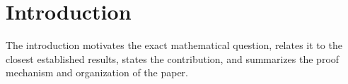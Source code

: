 \section{Introduction}

The introduction motivates the exact mathematical question, relates it to the
closest established results, states the contribution, and summarizes the proof
mechanism and organization of the paper.
